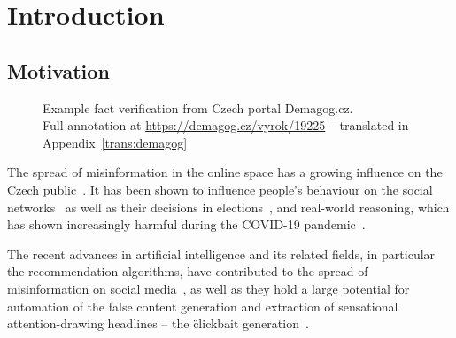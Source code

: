 
\chapter{Introduction}
\label{chap:intro}
\section{Motivation}
\label{sec:motivation}

\begin{figure}
\centering
\caption[Example fact verification from Czech portal Demagog.cz]{Example fact verification from Czech portal \textsf{Demagog.cz}.\\
Full annotation at \url{https://demagog.cz/vyrok/19225} -- translated in Appendix~\ref{trans:demagog}}
\label{fig:demagog}
\end{figure}
The spread of misinformation in the online space has a growing influence on the Czech public~\cite{stem}. It has been shown to influence people's behaviour on the social networks~\cite{Lazer1094} as well as their decisions in elections~\cite{10.1257/jep.31.2.211}, and real-world reasoning, which has shown increasingly harmful during the COVID-19 pandemic~\cite{BARUA2020100119}.

The recent advances in artificial intelligence and its related fields, in particular the recommendation algorithms, have contributed to the spread of misinformation on social media~\cite{doi:10.1177/2056305119888654}, as well as they hold a large potential for automation of the false content generation and extraction of sensational attention-drawing headlines -- the \"{clickbait} generation~\cite{shukai}.

